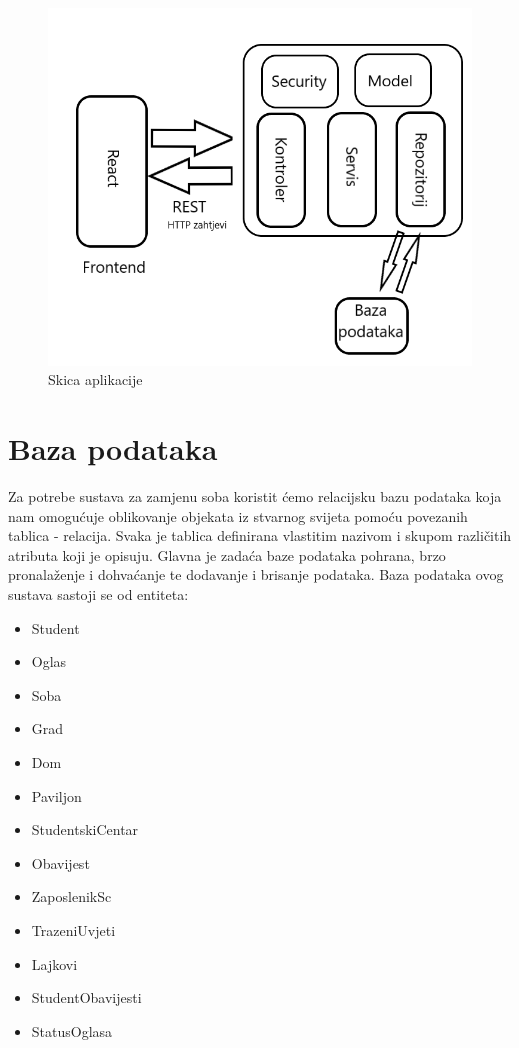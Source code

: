 \begin{figure}[H]
\includegraphics[scale=0.4]{slike/Skica_aplikacije.png} %
\centering
\caption{Skica aplikacije}
\label{fig:aplikacija}
\end{figure}


	
		

		

				
		\section{Baza podataka}
			
	Za potrebe sustava za zamjenu soba koristit ćemo relacijsku bazu podataka koja nam omogućuje oblikovanje objekata iz stvarnog svijeta pomoću povezanih tablica - relacija. Svaka je tablica definirana vlastitim nazivom i skupom različitih atributa koji je opisuju. Glavna je zadaća baze podataka pohrana, brzo pronalaženje i dohvaćanje te dodavanje i brisanje podataka. Baza podataka ovog sustava sastoji se od entiteta:
	\begin{itemize}
		\item Student
		\item Oglas
		\item Soba
		\item Grad
		\item Dom
		\item Paviljon
		\item StudentskiCentar
		\item Obavijest
		\item ZaposlenikSc
		\item TrazeniUvjeti
		\item Lajkovi
		\item StudentObavijesti
		\item StatusOglasa
		
	\end{itemize}
	
